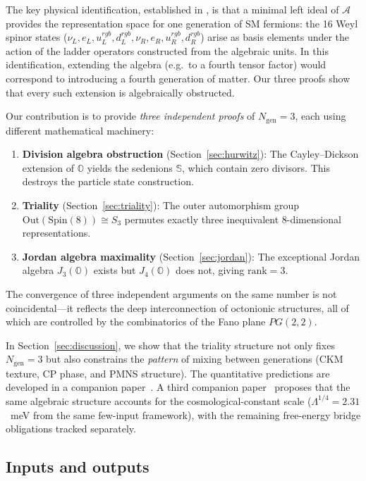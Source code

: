 \documentclass[12pt,a4paper]{article}
\theoremstyle{definition}
\theoremstyle{remark}
\newcommand{\Oct}{\mathbb{O}}
\newcommand{\Sed}{\mathbb{S}}
\newcommand{\Alg}{\mathcal{A}}
\newcommand{\Out}{\mathrm{Out}}
\newcommand{\Spin}{\mathrm{Spin}}
\begin{document}
The key physical identification, established in \cite{Furey2016,Furey2018}, 
is that a minimal left ideal of $\Alg$ provides the representation space 
for one generation of SM fermions: the 16 Weyl spinor states 
($\nu_L, e_L, u_L^{rgb}, d_L^{rgb}, \nu_R, e_R, u_R^{rgb}, d_R^{rgb}$) arise 
as basis elements under the action of the ladder operators constructed from 
the algebraic units. In this identification, extending the algebra (e.g.\ to 
a fourth tensor factor) would correspond to introducing a fourth generation 
of matter. Our three proofs show that every such extension is algebraically 
obstructed.

Our contribution is to provide \emph{three independent proofs} of 
$N_{\mathrm{gen}} = 3$, each using different mathematical machinery:
\begin{enumerate}
\item \textbf{Division algebra obstruction} (Section~\ref{sec:hurwitz}): 
The Cayley--Dickson extension of $\Oct$ yields the sedenions $\Sed$, which 
contain zero divisors. This destroys the particle state construction.

\item \textbf{Triality} (Section~\ref{sec:triality}): 
The outer automorphism group $\Out(\Spin(8)) \cong S_3$ permutes exactly 
three inequivalent 8-dimensional representations.

\item \textbf{Jordan algebra maximality} (Section~\ref{sec:jordan}): 
The exceptional Jordan algebra $J_3(\Oct)$ exists but $J_4(\Oct)$ does not, 
giving $\mathrm{rank} = 3$.
\end{enumerate}

The convergence of three independent arguments on the same number is not 
coincidental---it reflects the deep interconnection of octonionic structures, 
all of which are controlled by the combinatorics of the Fano plane $PG(2,2)$.

In Section~\ref{sec:discussion}, we show that the triality structure not only 
fixes $N_{\mathrm{gen}} = 3$ but also constrains the \emph{pattern} of mixing 
between generations (CKM texture, CP phase, and PMNS structure). The 
quantitative predictions are developed in a companion paper~\cite{Paper2}.
A third companion paper~\cite{Paper3} proposes that the same algebraic structure 
accounts for the cosmological-constant scale ($\Lambda^{1/4} = 2.31$~meV 
from the same few-input framework), with the remaining free-energy bridge 
obligations tracked separately.

\subsection*{Inputs and outputs}
\end{document}
